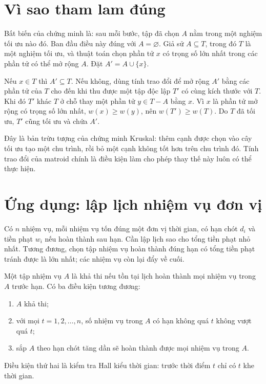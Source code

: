 \documentclass[11pt]{article}
\begin{document}
\section{Vì sao tham lam đúng}

Bất biến của chứng minh là: sau mỗi bước, tập đã chọn \(A\) nằm trong một
nghiệm tối ưu nào đó. Ban đầu điều này đúng với \(A=\varnothing\). Giả sử
\(A\subseteq T\), trong đó \(T\) là một nghiệm tối ưu, và thuật toán chọn
phần tử \(x\) có trọng số lớn nhất trong các phần tử có thể mở rộng \(A\).
Đặt \(A'=A\cup\{x\}\).

Nếu \(x\in T\) thì \(A'\subseteq T\). Nếu không, dùng tính trao đổi để mở rộng
\(A'\) bằng các phần tử của \(T\) cho đến khi thu được một tập độc lập \(T'\)
có cùng kích thước với \(T\). Khi đó \(T'\) khác \(T\) ở chỗ thay một phần tử
\(y\in T-A\) bằng \(x\). Vì \(x\) là phần tử mở rộng có trọng số lớn nhất,
\(w(x)\ge w(y)\), nên \(w(T')\ge w(T)\). Do \(T\) đã tối ưu, \(T'\) cũng tối
ưu và chứa \(A'\).

Đây là bản trừu tượng của chứng minh Kruskal: thêm cạnh được chọn vào cây
tối ưu tạo một chu trình, rồi bỏ một cạnh không tốt hơn trên chu trình đó.
Tính trao đổi của matroid chính là điều kiện làm cho phép thay thế này luôn
có thể thực hiện.

\section{Ứng dụng: lập lịch nhiệm vụ đơn vị}

Có \(n\) nhiệm vụ, mỗi nhiệm vụ tốn đúng một đơn vị thời gian, có hạn chót
\(d_i\) và tiền phạt \(w_i\) nếu hoàn thành sau hạn. Cần lập lịch sao cho
tổng tiền phạt nhỏ nhất. Tương đương, chọn tập nhiệm vụ hoàn thành đúng hạn
có tổng tiền phạt tránh được là lớn nhất; các nhiệm vụ còn lại đẩy về cuối.

Một tập nhiệm vụ \(A\) là khả thi nếu tồn tại lịch hoàn thành mọi nhiệm vụ
trong \(A\) trước hạn. Có ba điều kiện tương đương:
\begin{enumerate}
  \item \(A\) khả thi;
  \item với mọi \(t=1,2,\ldots,n\), số nhiệm vụ trong \(A\) có hạn không quá
  \(t\) không vượt quá \(t\);
  \item sắp \(A\) theo hạn chót tăng dần sẽ hoàn thành được mọi nhiệm vụ
  trong \(A\).
\end{enumerate}
Điều kiện thứ hai là kiểm tra Hall kiểu thời gian: trước thời điểm \(t\) chỉ
có \(t\) khe thời gian.
\end{document}
